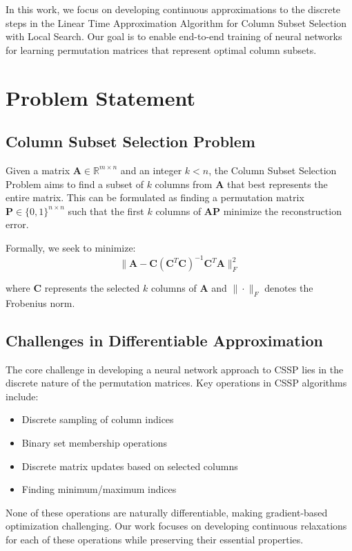 \documentclass{article}
\begin{document}
In this work, we focus on developing continuous approximations to the discrete steps in the Linear Time Approximation Algorithm for Column Subset Selection with Local Search. Our goal is to enable end-to-end training of neural networks for learning permutation matrices that represent optimal column subsets.

\section{Problem Statement}
\subsection{Column Subset Selection Problem}
Given a matrix $\mathbf{A} \in \mathbb{R}^{m \times n}$ and an integer $k < n$, the Column Subset Selection Problem aims to find a subset of $k$ columns from $\mathbf{A}$ that best represents the entire matrix. This can be formulated as finding a permutation matrix $\mathbf{P} \in \{0,1\}^{n \times n}$ such that the first $k$ columns of $\mathbf{A}\mathbf{P}$ minimize the reconstruction error.

Formally, we seek to minimize:
\begin{equation}
\|\mathbf{A} - \mathbf{C}(\mathbf{C}^T\mathbf{C})^{-1}\mathbf{C}^T\mathbf{A}\|_F^2
\end{equation}

where $\mathbf{C}$ represents the selected $k$ columns of $\mathbf{A}$ and $\|\cdot\|_F$ denotes the Frobenius norm.

\subsection{Challenges in Differentiable Approximation}
The core challenge in developing a neural network approach to CSSP lies in the discrete nature of the permutation matrices. Key operations in CSSP algorithms include:

\begin{itemize}
    \item Discrete sampling of column indices
    \item Binary set membership operations
    \item Discrete matrix updates based on selected columns
    \item Finding minimum/maximum indices
\end{itemize}

None of these operations are naturally differentiable, making gradient-based optimization challenging. Our work focuses on developing continuous relaxations for each of these operations while preserving their essential properties.
\end{document}
